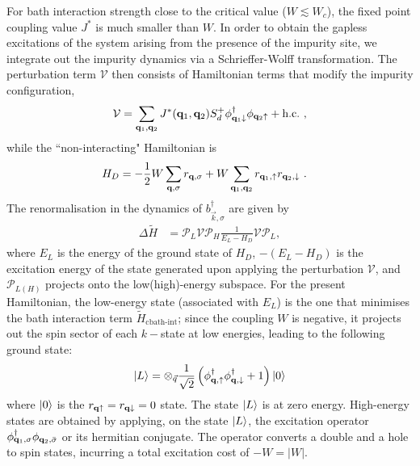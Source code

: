 \documentclass[reprint,hidelinks,onecolumn]{revtex4-2}
\begin{document}
For bath interaction strength close to the critical value (\(W \lesssim W_c\)), the fixed point coupling value \(J^*\) is much smaller than \(W\). In order to obtain the gapless excitations of the system arising from the presence of the impurity site, we integrate out the impurity dynamics via a Schrieffer-Wolff transformation. The perturbation term \(\mathcal{V}\) then consists of Hamiltonian terms that modify the impurity configuration,
\begin{equation}\begin{aligned}
	\mathcal{V} = \sum_{{\bf q}_1, {\bf q}_2}J^*({\bf q}_1,{\bf q}_2){S}_d^+{\phi}^\dagger_{{\bf q}_1 \downarrow} \phi_{{\bf q}_2 \uparrow} + \text{h.c.}~,
\end{aligned}\end{equation}
while the ``non-interacting" Hamiltonian is
\begin{equation}\begin{aligned}
	H_D &= -\frac{1}{2}W\sum_{{\bf q},\sigma}r_{{\bf q},\sigma} + W\sum_{{\bf q}_1,{\bf q}_2}r_{{\bf q}_1,\uparrow} r_{{\bf q}_2,\downarrow}~.
\end{aligned}\end{equation}
The renormalisation in the dynamics of \(b^\dagger_{\vec k,\sigma}\) are given by
\begin{equation}\begin{aligned}
	\Delta \tilde H &= \mathcal{P}_L \mathcal{V} \mathcal{P}_H\frac{1}{E_L - H_D} \mathcal{V} \mathcal{P}_L,
\end{aligned}\end{equation}
where \(E_L\) is the energy of the ground state of \(H_D\), \(-(E_L - H_D)\) is the excitation energy of the state generated upon applying the perturbation \(\mathcal{V}\), and \(\mathcal{P}_{L(H)}\) projects onto the low(high)-energy subspace. For the present Hamiltonian, the low-energy state (associated with \(E_L\)) is the one that minimises the bath interaction term \(\tilde H_\text{cbath-int}\); since the coupling \(W\) is negative, it projects out the spin sector of each \(k-\)state at low energies, leading to the following ground state:
\begin{equation}\begin{aligned}
	\ket{L} = \otimes_{\vec q}\frac{1}{\sqrt 2}\left(\phi^\dagger_{{\bf q}, \uparrow}\phi^\dagger_{{\bf q}, \downarrow} + 1\right) \ket{0}
\end{aligned}\end{equation}
where \(\ket{0}\) is the \(r_{{\bf q} \uparrow} = r_{{\bf q} \downarrow} = 0\) state. The state \(\ket{L}\) is at zero energy. High-energy states are obtained by applying, on the state \(\ket{L}\), the excitation operator \(\phi^\dagger_{{\bf q}_1,\sigma}\phi_{{\bf q}_2,\bar\sigma}\) or its hermitian conjugate. The operator converts a double and a hole to spin states, incurring a total excitation cost of \(-W = |W|\).
\end{document}
